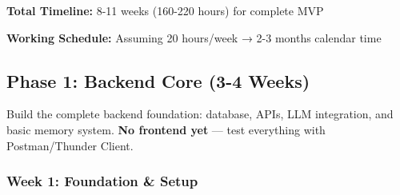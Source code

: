 \documentclass[12pt,a4paper]{article}
\begin{document}
\vspace{0.5cm}
\textbf{Total Timeline:} 8-11 weeks (160-220 hours) for complete MVP

\textbf{Working Schedule:} Assuming 20 hours/week → 2-3 months calendar time

\newpage

\subsection{Phase 1: Backend Core (3-4 Weeks)}

\begin{tcolorbox}[colback=switchitgreen!5,colframe=switchitgreen,title=\textbf{Phase 1 Goal}]
Build the complete backend foundation: database, APIs, LLM integration, and basic memory system. \textbf{No frontend yet} — test everything with Postman/Thunder Client.
\end{tcolorbox}

\subsubsection{Week 1: Foundation \& Setup}
\end{document}
